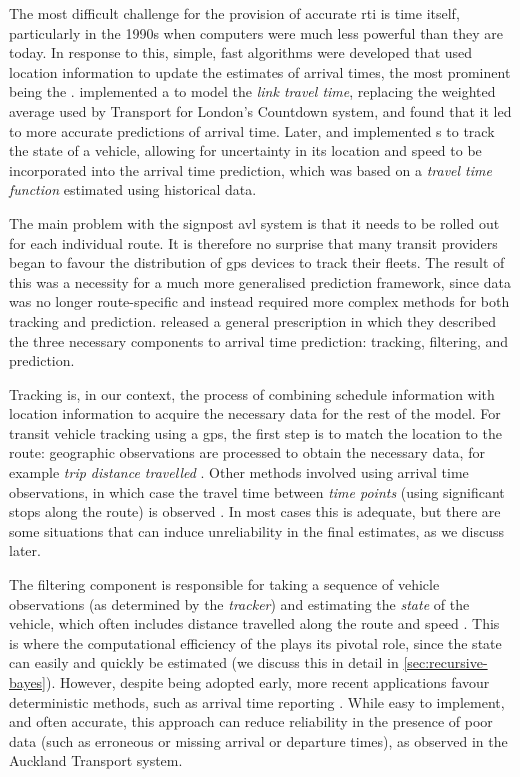 The most difficult challenge for the provision of accurate \gls{rti} is time itself, particularly in the 1990s when computers were much less powerful than they are today. In response to this, simple, fast algorithms were developed that used \rt{} location information to update the estimates of arrival times, the most prominent being the \kf{}. \citet{Reinhoudt_1997} implemented a \kf{} to model the \emph{link travel time}, replacing the weighted average used by Transport for London's Countdown system, and found that it led to more accurate predictions of arrival time. Later, \citet{Wall_1999} and \citet{Dailey_2001} implemented \kf{}s to track the state of a vehicle, allowing for uncertainty in its location and speed to be incorporated into the arrival time prediction, which was based on a \emph{travel time function} estimated using historical data.



The main problem with the signpost \gls{avl} system is that it needs to be rolled out for each individual route. It is therefore no surprise that many transit providers began to favour the distribution of \gls{gps} devices to track their fleets. The result of this was a necessity for a much more generalised prediction framework, since data was no longer route-specific and instead required more complex methods for both tracking and prediction. \citet{Cathey_2003} released a general prescription in which they described the three necessary components to arrival time prediction: tracking, filtering, and prediction.


Tracking is, in our context, the process of combining schedule information with \rt{} location information to acquire the necessary data for the rest of the model. For transit vehicle tracking using a \gls{gps}, the first step is to match the location to the route: geographic observations are processed to obtain the necessary data, for example \emph{trip distance travelled} \citep{Cathey_2003,Gong_2013}. Other methods involved using arrival time observations, in which case the travel time between \emph{time points} (using significant stops along the route) is observed \citep{Shalaby_2004,Jeong_2005,Yu_2011}. In most cases this is adequate, but there are some situations that can induce unreliability in the final estimates, as we discuss later.


The filtering component is responsible for taking a sequence of vehicle observations (as determined by the \emph{tracker}) and estimating the \emph{state} of the vehicle, which often includes distance travelled along the route and speed \citep{Dailey_2001,Cathey_2003}. This is where the computational efficiency of the \kf{} plays its pivotal role, since the state can easily and quickly be estimated (we discuss this in detail in \cref{sec:recursive-bayes}). However, despite being adopted early, more recent applications favour deterministic methods, such as arrival time reporting \citep{Yin_2017,Cats_2015,Cats_2016}. While easy to implement, and often accurate, this approach can reduce reliability in the presence of poor data (such as erroneous or missing arrival or departure times), as observed in the Auckland Transport system.


